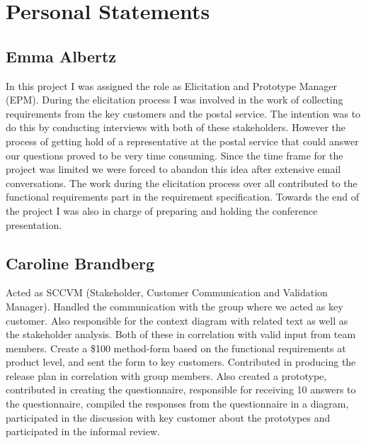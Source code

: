 \documentclass[10pt,a4paper]{article}
\begin{document}
\section{Personal Statements}

\subsection{Emma Albertz}
In this project I was assigned the role as Elicitation and Prototype Manager (EPM). During the elicitation process I was involved in the work of collecting requirements from the key customers and the postal service. The intention was to do this by conducting interviews with both of these stakeholders. However the process of getting hold of a representative at the postal service that could answer our questions proved to be very time consuming. Since the time frame for the project was limited we were forced to abandon this idea after extensive email conversations. The work during the elicitation process over all contributed to the functional requirements part in the requirement specification. Towards the end of the project I was also in charge of preparing and holding the conference presentation. 

\subsection{Caroline Brandberg}
Acted as SCCVM (Stakeholder, Customer Communication and Validation Manager). Handled the communication with the group where we acted as key customer. Also responsible for the context diagram with related text as well as the stakeholder analysis. Both of these in correlation with valid input from team members. Create a \$100 method-form based on the functional requirements at product level, and sent the form to key customers. Contributed in producing the release plan in correlation with group members.  Also created a prototype, contributed in creating the questionnaire, responsible for receiving 10 answers to the questionnaire, compiled the responses from the questionnaire in a diagram, participated in the discussion with key customer about the prototypes and participated in the informal review. 
\end{document}
